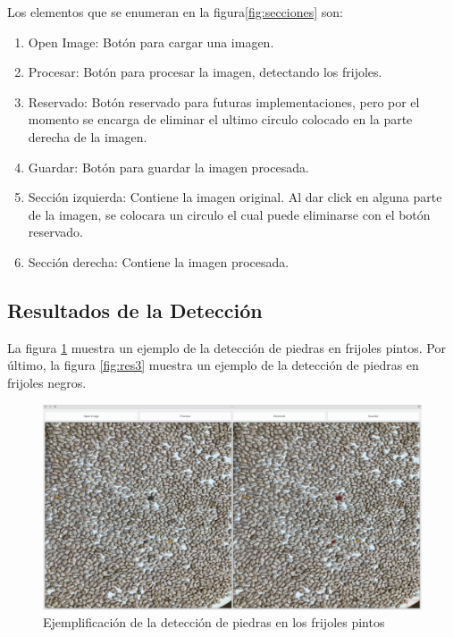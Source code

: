 \documentclass[conference]{IEEEtran}
\begin{document}
    Los elementos que se enumeran en la figura\ref{fig:secciones} son:
    \begin{enumerate}
        \item Open Image: Botón para cargar una imagen.
        \item Procesar: Botón para procesar la imagen, detectando los frijoles.
        \item Reservado: Botón reservado para futuras implementaciones, pero por el momento se encarga de eliminar el ultimo circulo colocado en la parte derecha de la imagen.
        \item Guardar: Botón para guardar la imagen procesada.
        \item Sección izquierda: Contiene la imagen original. Al dar click en alguna parte de la imagen, se colocara un circulo el cual puede eliminarse con el botón reservado.
        \item Sección derecha: Contiene la imagen procesada.
    \end{enumerate}


    \subsection{Resultados de la Detección}
    La figura \ref{fig:res2} muestra un ejemplo de la detección de piedras en frijoles pintos. Por último, la figura \ref{fig:res3} muestra un ejemplo de la detección de piedras en frijoles negros.

    \begin{figure}[H]
        \centering
        \includegraphics[width=\breite\linewidth]{images/pintos.png}
        \caption{Ejemplificación de la detección de piedras en los frijoles pintos}
        \label{fig:res2}
    \end{figure}
\end{document}
